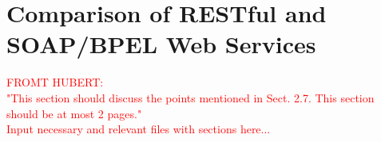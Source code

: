 \chapter{Comparison of RESTful and SOAP/BPEL Web Services}
\textcolor{red}{FROMT HUBERT:\\
"This section should discuss the points mentioned in Sect. 2.7. This section should be at most 2 pages."\\
Input necessary and relevant files with sections here...}
